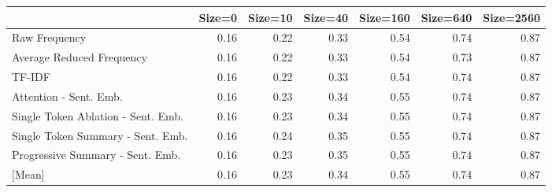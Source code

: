 \begin{tabular}{lrrrrrr}
\toprule
 & Size=0 & Size=10 & Size=40 & Size=160 & Size=640 & Size=2560 \\
\midrule
Raw Frequency & \cellcolor[RGB]{58,76,192}0.16 & \cellcolor[RGB]{83,112,221}0.22 & \cellcolor[RGB]{137,172,252}0.33 & \cellcolor[RGB]{230,215,207}0.54 & \cellcolor[RGB]{234,123,96}0.74 & \cellcolor[RGB]{179,3,38}0.87 \\
Average Reduced Frequency & \cellcolor[RGB]{58,76,192}0.16 & \cellcolor[RGB]{83,112,221}0.22 & \cellcolor[RGB]{137,172,252}0.33 & \cellcolor[RGB]{230,215,207}0.54 & \cellcolor[RGB]{236,130,102}0.73 & \cellcolor[RGB]{179,3,38}0.87 \\
TF-IDF & \cellcolor[RGB]{58,76,192}0.16 & \cellcolor[RGB]{83,112,221}0.22 & \cellcolor[RGB]{137,172,252}0.33 & \cellcolor[RGB]{230,215,207}0.54 & \cellcolor[RGB]{234,123,96}0.74 & \cellcolor[RGB]{179,3,38}0.87 \\
Attention - Sent. Emb. & \cellcolor[RGB]{58,76,192}0.16 & \cellcolor[RGB]{88,118,226}0.23 & \cellcolor[RGB]{141,175,253}0.34 & \cellcolor[RGB]{232,213,202}0.55 & \cellcolor[RGB]{234,123,96}0.74 & \cellcolor[RGB]{179,3,38}0.87 \\
Single Token Ablation - Sent. Emb. & \cellcolor[RGB]{58,76,192}0.16 & \cellcolor[RGB]{88,118,226}0.23 & \cellcolor[RGB]{141,175,253}0.34 & \cellcolor[RGB]{232,213,202}0.55 & \cellcolor[RGB]{234,123,96}0.74 & \cellcolor[RGB]{179,3,38}0.87 \\
Single Token Summary - Sent. Emb. & \cellcolor[RGB]{58,76,192}0.16 & \cellcolor[RGB]{92,123,229}0.24 & \cellcolor[RGB]{146,180,254}0.35 & \cellcolor[RGB]{232,213,202}0.55 & \cellcolor[RGB]{234,123,96}0.74 & \cellcolor[RGB]{179,3,38}0.87 \\
Progressive Summary - Sent. Emb. & \cellcolor[RGB]{58,76,192}0.16 & \cellcolor[RGB]{88,118,226}0.23 & \cellcolor[RGB]{146,180,254}0.35 & \cellcolor[RGB]{232,213,202}0.55 & \cellcolor[RGB]{234,123,96}0.74 & \cellcolor[RGB]{179,3,38}0.87 \\
\midrule
{[Mean]} & \cellcolor[RGB]{58,76,192}0.16 & \cellcolor[RGB]{87,117,225}0.23 & \cellcolor[RGB]{141,175,253}0.34 & \cellcolor[RGB]{231,214,204}0.55 & \cellcolor[RGB]{234,125,97}0.74 & \cellcolor[RGB]{179,3,38}0.87 \\
\bottomrule
\end{tabular}